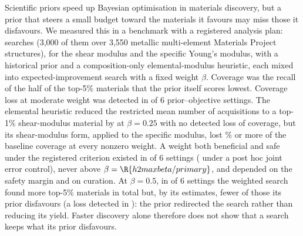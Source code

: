 Scientific priors speed up Bayesian optimisation in materials discovery, but a prior that steers a small budget toward the
materials it favours may miss those it disfavours. We measured this in a benchmark with a registered
analysis plan:  searches (3,000 of them over 3,550 metallic multi-element Materials Project
structures), for the shear modulus and the specific Young's modulus, with a historical prior and a composition-only elemental-modulus
heuristic, each mixed into expected-improvement search with a fixed weight
$\beta$. Coverage was the recall of the half of the top-5\% materials that the prior itself scores lowest. Coverage loss at
moderate weight was detected in  of 6 prior--objective settings. The elemental heuristic reduced the restricted
mean number of acquisitions to a top-1\% shear-modulus material by  at $\beta=0.25$
with no detected loss of coverage, but its shear-modulus form, applied to the specific modulus, lost
\% or more of the baseline coverage at every nonzero weight. A weight
both beneficial and safe under the registered criterion existed in  of 6 settings
( under a post hoc joint error control), never above $\beta=\R{h2maxbeta/primary}$, and depended
on the safety margin and on curation. At $\beta=0.5$, in  of 6 settings the weighted
search found more top-5\% materials in total but, by its estimates, fewer of those its prior disfavours (a loss detected in
): the prior redirected the search rather than reducing its yield. Faster discovery alone therefore does not show
that a search keeps what its prior disfavours.
